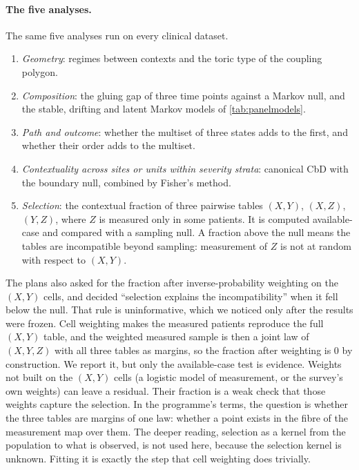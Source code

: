 \documentclass[11pt]{article}
\theoremstyle{definition}
\theoremstyle{remark}
\begin{document}
\paragraph{The five analyses.} The same five analyses run on every clinical dataset.
\begin{enumerate}[label=\Alph*.,leftmargin=*,nosep]
\item \emph{Geometry}: regimes between contexts and the toric type of the coupling polygon.
\item \emph{Composition}: the gluing gap of three time points against a Markov null, and the stable, drifting and latent Markov models of
  \cref{tab:panelmodels}.
\item \emph{Path and outcome}: whether the multiset of three states adds to the first, and whether their order adds to the multiset.
\item \emph{Contextuality across sites or units within severity strata}: canonical CbD with the boundary null, combined by Fisher's method.
\item \emph{Selection}: the contextual fraction of three pairwise tables $(X,Y)$, $(X,Z)$, $(Y,Z)$, where $Z$ is measured only in some
  patients. It is computed available-case and compared with a sampling null. A fraction above the null means the tables are incompatible
  beyond sampling: measurement of $Z$ is not at random with respect to $(X,Y)$.
\end{enumerate}
The plans also asked for the fraction after inverse-probability weighting on the $(X,Y)$ cells, and decided ``selection explains the
incompatibility'' when it fell below the null. That rule is uninformative, which we noticed only after the results were frozen. Cell
weighting makes the measured patients reproduce the full $(X,Y)$ table, and the weighted measured sample is then a joint law of
$(X,Y,Z)$ with all three tables as margins, so the fraction after weighting is $0$ by construction. We report it, but only the
available-case test is evidence. Weights not built on the $(X,Y)$ cells (a logistic model of measurement, or the survey's own weights) can
leave a residual. Their fraction is a weak check that those weights capture the selection.
In the programme's terms, the question is whether the three tables are margins of one law: whether a point exists in the fibre of the
measurement map over them. The deeper reading, selection as a kernel from the population to what is observed, is not used here, because
the selection kernel is unknown. Fitting it is exactly the step that cell weighting does trivially.
\end{document}
